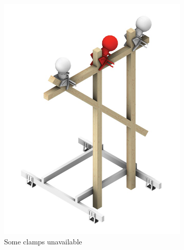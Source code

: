\begin{figure}
\begin{subfigure}[b]{0.32\textwidth}
        \includegraphics[width=\textwidth]{images/05/clamp-assignment-2.png}
        \caption{Some clamps unavailable}
        \label{fig:clamp-assignment-2}
    \end{subfigure}
    \hfill
    \begin{subfigure}[b]{0.32\textwidth}
        \centering

\end{subfigure}
\end{figure}

